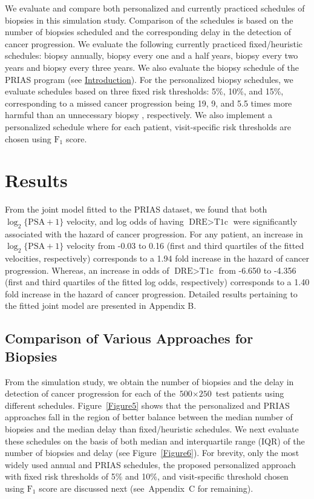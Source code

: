 \documentclass[Afour,sagev,times]{sagej}
\begin{document}
We evaluate and compare both personalized and currently practiced schedules of biopsies in this simulation study. Comparison of the schedules is based on the number of biopsies scheduled and the corresponding delay in the detection of cancer progression. We evaluate the following currently practiced fixed/heuristic schedules: biopsy annually, biopsy every one and a half years, biopsy every two years and biopsy every three years. We also evaluate the biopsy schedule of the PRIAS program (see \hyperref[sec:introduction]{Introduction}). For the personalized biopsy schedules, we evaluate schedules based on three fixed risk thresholds: 5\%, 10\%, and 15\%, corresponding to a missed cancer progression being 19, 9, and 5.5 times more harmful than an unnecessary biopsy \cite{vickers2006decision}, respectively. We also implement a personalized schedule where for each patient, visit-specific risk thresholds are chosen using $\mbox{F}_1$ score.

\section{Results}
\label{sec:results}
From the joint model fitted to the PRIAS dataset, we found that both $\log_2 \{\mbox{PSA} + 1\}$ velocity,  and log odds of having $\mbox{DRE} > \mbox{T1c}$  were significantly associated with the hazard of cancer progression. For any patient, an increase in $\log_2 \{\mbox{PSA} + 1\}$ velocity from -0.03 to 0.16 (first and third quartiles of the fitted velocities, respectively) corresponds to a 1.94 fold increase in the hazard of cancer progression. Whereas, an increase in odds of $\mbox{DRE} > \mbox{T1c}$ from -6.650 to -4.356 (first and third quartiles of the fitted log odds, respectively) corresponds to a 1.40 fold increase in the hazard of cancer progression. Detailed results pertaining to the fitted joint model are presented in Appendix B.

\subsection{Comparison of Various Approaches for Biopsies}
From the simulation study, we obtain the number of biopsies and the delay in detection of cancer progression for each of the ${\mbox{500} \times \mbox{250}}$ test patients using different schedules. Figure~\ref{Figure5} shows that the personalized and PRIAS approaches fall in the region of better balance between the median number of biopsies and the median delay than fixed/heuristic schedules. We next evaluate these schedules on the basis of both median and interquartile range (IQR) of the number of biopsies and delay (see Figure~\ref{Figure6}). For brevity, only the most widely used annual and PRIAS schedules, the proposed personalized approach with fixed risk thresholds of 5\% and 10\%, and visit-specific threshold chosen using $\mbox{F}_1$ score are discussed next (see~Appendix~C for remaining).
\end{document}
